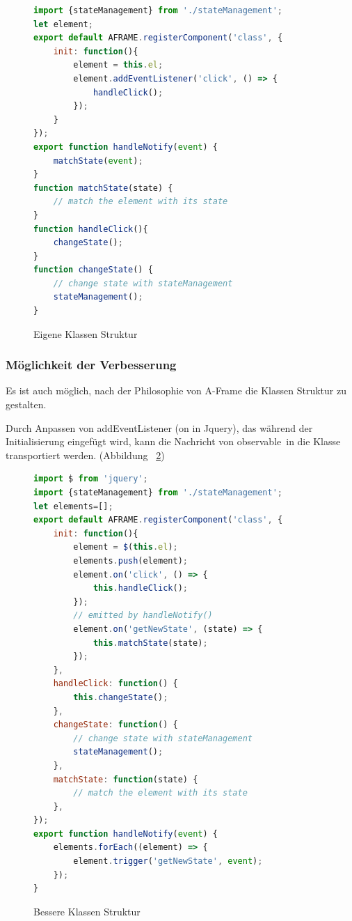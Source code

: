 \begin{figure}[ht]
\vspace*{1em}
\centering
\caption[Eigene Klassen Struktur]{Eigene Klassen Struktur}
\begin{lstlisting}[language=JavaScript, style=htmlcssjs]
import {stateManagement} from './stateManagement';
let element;
export default AFRAME.registerComponent('class', {
    init: function(){
        element = this.el;
        element.addEventListener('click', () => {
            handleClick();
        });
    }
});
export function handleNotify(event) {
    matchState(event);
}
function matchState(state) {
    // match the element with its state
}
function handleClick(){
    changeState();
}
function changeState() {
    // change state with stateManagement
    stateManagement();
}
\end{lstlisting}
\label{fig:eigenesClass} 
\end{figure}
 
 \subsubsection{Möglichkeit der Verbesserung}
 Es ist auch möglich, nach der Philosophie von A-Frame die Klassen Struktur zu gestalten.
 
 Durch Anpassen von {\selectfont addEventListener} ({\selectfont on} in Jquery), das während der Initialisierung eingefügt wird, kann die Nachricht von \glqq observable\grqq\ in die Klasse transportiert werden. (Abbildung ~\ref{fig:bestesClass})
 
\begin{figure}[ht]
\vspace*{1em}
\centering
\caption[Bessere Klassen Struktur]{Bessere Klassen Struktur}
\begin{lstlisting}[language=JavaScript, style=htmlcssjs]
import $ from 'jquery';
import {stateManagement} from './stateManagement';
let elements=[];
export default AFRAME.registerComponent('class', {
    init: function(){
        element = $(this.el);
        elements.push(element);
        element.on('click', () => {
            this.handleClick();
        });
        // emitted by handleNotify()
        element.on('getNewState', (state) => {
            this.matchState(state);
        });
    },
    handleClick: function() {
        this.changeState();
    },
    changeState: function() {
        // change state with stateManagement
        stateManagement();
    },
    matchState: function(state) {
        // match the element with its state
    },
});
export function handleNotify(event) {
    elements.forEach((element) => {
        element.trigger('getNewState', event);
    });
}
\end{lstlisting}
\label{fig:bestesClass} 
\end{figure}
 
